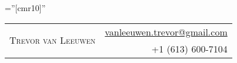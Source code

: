 \documentclass[letterpaper,10pt]{article}
\begin{document}
\pagestyle{empty} %

\font\fb=''[cmr10]'' %

\begin{adjustwidth}{-0.2cm}{}
\par{
    \begin{tabular}{lr}

        \multirow{2}{13.15cm}{\Huge{\textsc{Trevor van Leeuwen}}} & \href{mailto:vanleeuwen.trevor@gmail.com}{vanleeuwen.trevor@gmail.com} \\
         & +1 (613) 600-7104
    \end{tabular}
\medskip\par}
\end{adjustwidth}


\end{document}
